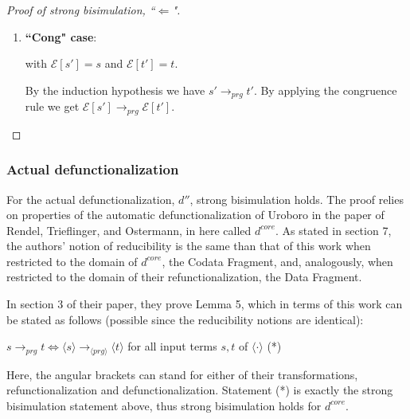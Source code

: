\documentclass[11pt]{article} %
\begin{document}
\begin{proof}[Proof of strong bisimulation, ``$\Leftarrow$"]
\begin{enumerate}
\begin{itemize}
There is no conflict between the substitutions for, e.g., $x_1$ and $y_2$, since all variables that are substituted are distinct, as can be seen in the definition of $split$.

\end{itemize}

This concludes the proof for the ``Subst" case.

\item \textbf{``Cong" case}:

\begin{prooftree}
\end{prooftree}

with $\mathcal{E}[s'] = s$ and $\mathcal{E}[t'] = t$.

By the induction hypothesis we have $s' \longrightarrow_{prg} t'$. By applying the congruence rule we get $\mathcal{E}[s'] \longrightarrow_{prg} \mathcal{E}[t']$.

\end{enumerate}

\end{proof}

\subsubsection{Actual defunctionalization}

For the actual defunctionalization, $d''$, strong bisimulation holds. The proof relies on properties of the automatic defunctionalization of Uroboro in the paper of Rendel, Trieflinger, and Ostermann, in here called $d^{core}$. As stated in section 7, the authors' notion of reducibility is the same than that of this work when restricted to the domain of $d^{core}$, the Codata Fragment, and, analogously, when restricted to the domain of their refunctionalization, the Data Fragment.

In section 3 of their paper, they prove Lemma 5, which in terms of this work can be stated as follows (possible since the reducibility notions are identical):

$s \longrightarrow_{prg} t \iff \langle s \rangle \longrightarrow_{\langle prg \rangle} \langle t \rangle$ for all input terms $s,t$ of $\langle \cdot \rangle$ (*)

Here, the angular brackets can stand for either of their transformations, refunctionalization and defunctionalization. Statement (*) is exactly the strong bisimulation statement above, thus strong bisimulation holds for $d^{core}$.
\end{document}
